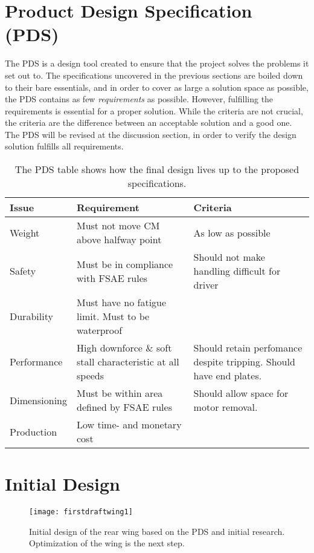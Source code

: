   \section{Product Design Specification (PDS)}
  \label{sec:PDS}

    The PDS is a design tool created to ensure that the project solves the problems it set out to. The specifications uncovered in the previous sections are boiled down to their bare essentials, and in order to cover as large a solution space as possible, the PDS contains as few \emph{requirements} as possible. However, fulfilling the requirements is essential for a proper solution. While the criteria are not crucial, the criteria are the difference between an acceptable solution and a good one. The PDS will be revised at the discussion section, in order to verify the design solution fulfills all requirements.
    \begin{table}
      \begin{tabularx}{\textwidth}[t]{>{\columncolor{seapurple!40}}l XX}
      \arrayrulecolor{seapurple}\hline
      \rowcolor{white}
      \textbf{\textcolor{seapurple}{Issue}} & \textbf{\textcolor{seapurple}{Requirement}} & \textbf{\textcolor{seapurple}{Criteria}}\\
      \hline
      Weight & Must not move CM above halfway point & As low as possible \\
      Safety & Must be in compliance with FSAE rules & Should not make handling difficult for driver\\
      Durability & Must have no fatigue limit. Must to be waterproof & \\
      Performance & High downforce \& soft stall characteristic at all speeds & Should retain perfomance despite tripping. Should have end plates.\\
      Dimensioning & Must be within area defined by FSAE rules & Should allow space for motor removal. \\
      Production & Low time- and monetary cost & \\
      \end{tabularx}
      \caption{The PDS table shows how the final design lives up to the proposed specifications.}
    \end{table}
  \section{Initial Design}

    \begin{figure}
      \texttt{[image: firstdraftwing1]}
      \caption{Initial design of the rear wing based on the PDS and initial research. Optimization of the wing is the next step.}
      \label{fig:firstdraftwing}
    \end{figure}

